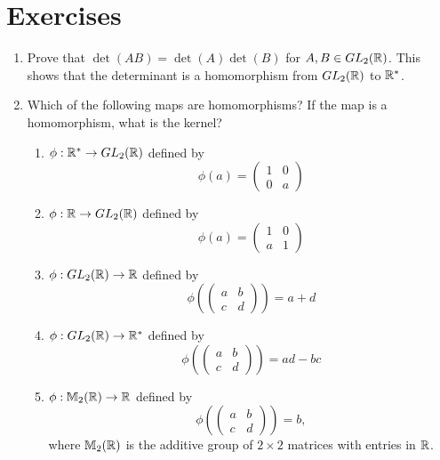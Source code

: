  
\section*{Exercises}
\exrule
 
 
 
{\small
 
 
\begin{enumerate}
 
 
 
\bf\item\rm
Prove that $\det( AB) = \det(A) \det(B)$ for $A, B \in GL_2( {\Bbb R}
)$. This shows that the determinant is a homomorphism from $GL_2(
{\Bbb R} )$ to ${\Bbb R}^*$. 
 
 
 
\bf\item\rm
Which of the following maps are homomorphisms? If the map is a
homomorphism, what is the kernel? 
\begin{enumerate}
 
 \bf\item\rm
$\phi : {\Bbb R}^\ast \rightarrow GL_2 ( {\Bbb R})$ defined by
$$
\phi( a ) =
\left(
\begin{array}{cc}
1 & 0 \\
0 & a
\end{array}
\right)
$$
 
 \bf\item\rm
$\phi : {\Bbb R} \rightarrow GL_2 ( {\Bbb R})$ defined by
$$
\phi( a ) =
\left(
\begin{array}{cc}
1 & 0 \\
a & 1
\end{array}
\right)
$$
 
 \bf\item\rm
$\phi : GL_2 ({\Bbb R})   \rightarrow {\Bbb R}$ defined by
$$
\phi
\left(
\left(
\begin{array}{cc}
a & b \\
c & d
\end{array}
\right)
\right)
= a + d
$$
 
 \bf\item\rm
$\phi : GL_2 ( {\Bbb R})   \rightarrow {\Bbb R}^\ast$ defined by 
$$
\phi
\left(
\left(
\begin{array}{cc}
a & b \\
c & d
\end{array}
\right)
\right)
= ad -bc
$$
 
 \bf\item\rm
$\phi : {\Bbb M}_2( {\Bbb R})   \rightarrow {\Bbb R}$ defined by
$$
\phi
\left(
\left(
\begin{array}{cc}
a & b \\
c & d
\end{array}
\right)
\right)
= b,
$$
where ${\Bbb M}_2( {\Bbb R})$ is the additive group of $2 \times
2$ matrices with entries in ${\Bbb R}$.
 

\end{enumerate}
\end{enumerate}}
